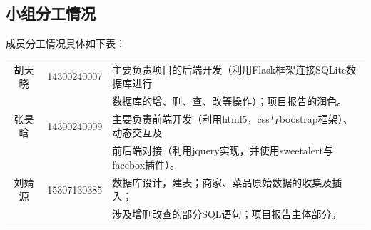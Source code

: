 \documentclass[12pt, oneside,a4paper]{article}
\begin{document}
\subsection{小组分工情况}
成员分工情况具体如下表：
\begin{table}[!h]
\begin{tabular}{|c|c|l|}
\hline
胡天晓 & 14300240007 & 主要负责项目的后端开发（利用Flask框架连接SQLite数据库进行\\
 & & 数据库的增、删、查、改等操作）；项目报告的润色。 \\
\hline
张昊晗 & 14300240009 & 主要负责前端开发（利用html5，css与boostrap框架）、动态交互及\\
& & 前后端对接（利用jquery实现，并使用sweetalert与facebox插件）。 \\
\hline
刘婧源 & 15307130385 & 数据库设计，建表；商家、菜品原始数据的收集及插入；\\
 & & 涉及增删改查的部分SQL语句；项目报告主体部分。\\
\hline
\end{tabular}
\end{table} 
\end{document}
